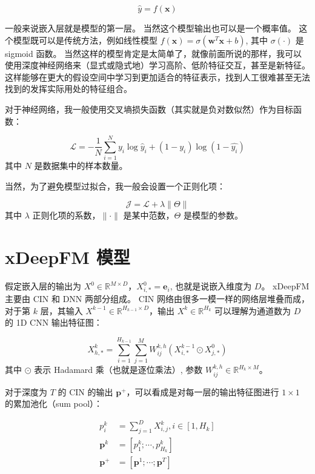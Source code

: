 \documentclass[degree=project,degree-type=project,cjk-font=noto]{thuthesis}
\begin{document}
\begin{equation}
  \hat{y} = f(\symbf{x})
\end{equation}

一般来说嵌入层就是模型的第一层。
当然这个模型输出也可以是一个概率值。
这个模型既可以是传统方法，例如线性模型 $f(\symbf{x}) = \sigma(\symbf{w}^T \symbf{x} + b)$, 其中 $\sigma(\cdot)$ 是 sigmoid 函数。
当然这样的模型肯定是太简单了，就像前面所说的那样，我可以使用深度神经网络来（显式或隐式地）学习高阶、低阶特征交互，甚至是新特征。
这样能够在更大的假设空间中学习到更加适合的特征表示，找到人工很难甚至无法找到的发挥实际用处的特征组合。

对于神经网络，我一般使用交叉墒损失函数（其实就是负对数似然）作为目标函数：

\begin{equation} \label{eq:loss}
  \mathcal{L} = - \frac{1}{N} \sum_{i=1}^N y_i \log \hat{y}_i + (1 - y_i) \log (1 - \hat{y_i})
\end{equation}
其中 $N$ 是数据集中的样本数量。

当然，为了避免模型过拟合，我一般会设置一个正则化项：

\begin{equation}
  \mathcal{J} = \mathcal{L} + \lambda \lVert \Theta \rVert
\end{equation}
其中 $\lambda$ 正则化项的系数，$\lVert \cdot \rVert$ 是某中范数，$\Theta$ 是模型的参数。

\section{xDeepFM 模型}

假定嵌入层的输出为 $X^0 \in \mathbb{R}^{M \times D}$，$X^0_{i,*} = \bm{e}_i$, 也就是说嵌入维度为 $D$。
xDeepFM 主要由 CIN 和 DNN 两部分组成。
CIN 网络由很多一模一样的网络层堆叠而成，对于第 $k$ 层，其输入 $X^{k-1} \in \mathbb{R}^{H_{k-1} \times D}$，输出 $X^k \in \mathbb{R}^{H_k}$ 可以理解为通道数为 $D$ 的 1D CNN 输出特征图：

\begin{equation}
  X^k_{h,*} = \sum_{i=1}^{H_{k-1}} \sum_{j=1}^{M} W_{ij}^{k,h}(X_{i,*}^{k-1} \odot X_{j,*}^0)
\end{equation}
其中 $\odot$ 表示 Hadamard 乘（也就是逐位乘法）, 参数 $W_{ij}^{k,h} \in \mathbb{R}^{H_k \times M}$。

对于深度为 $T$ 的 CIN 的输出 $\bm{p}^+$，可以看成是对每一层的输出特征图进行 $1\times 1$ 的累加池化（sum pool）：

\begin{align}
  p_i^k &= \sum_{j=1}^D X_{i,j}^k, i \in [1, H_k] \\
  \bm{p}^k &= [p_1^k; \cdots, p_{H_k}^k] \\
  \bm{p}^+ &= [\bm{p}^1; \cdots; \bm{p}^T]
\end{align}
\end{document}
